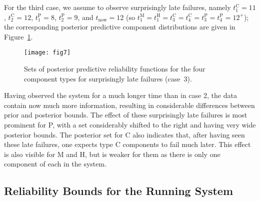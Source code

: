 \documentclass[Journal,letterpaper]{ascelike-new}
\def\tnow{t_\text{now}}
\begin{document}
For the third case, we assume to observe surprisingly late failures,
namely $t_1^\text{C} = 11$, $t_2^\text{C} = 12$, $t_1^\text{P} = 8$, $t_2^\text{P} = 9$,
and $\tnow = 12$ (so $t_1^\text{M} = t_1^\text{H} = t_3^\text{C} = t_4^\text{C} = t_3^\text{P} = t_4^\text{P} = 12^+$);
the corresponding posterior predictive component distributions are given in Figure~\ref{fig:comppost-3}.
%
\begin{figure}
\texttt{[image: fig7]}
\caption{Sets of posterior predictive reliability functions for the four component types
for surprisingly late failures (case~3).}
\label{fig:comppost-3}
\end{figure}
%
Having observed the system for a much longer time than in case 2,
the data contain now much more information,
resulting in considerable differences between prior and posterior bounds. %
The effect of these surprisingly late failures is most prominent for P,
with a set considerably shifted to the right and having very wide posterior bounds.
The posterior set for C also indicates that,
after having seen these late failures, one expects type C components to fail much later.
This effect is also visible for M and H,
but is weaker for them as there is only one component of each in the system.

\subsection{Reliability Bounds for the Running System}
\label{sec:ex-sysrel}
\end{document}
